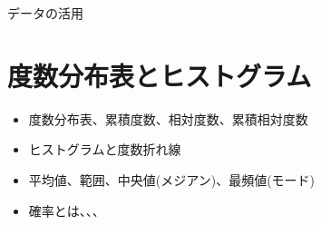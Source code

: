 \documentclass[11pt]{article}
\begin{document}
\newpage

{\LARGE \noindent データの活用}
\section{度数分布表とヒストグラム}
\begin{itemize}
\item 度数分布表、累積度数、相対度数、累積相対度数
\item ヒストグラムと度数折れ線
\item 平均値、範囲、中央値(メジアン)、最頻値(モード)
\item 確率とは、、、
\end{itemize}
\end{document}
